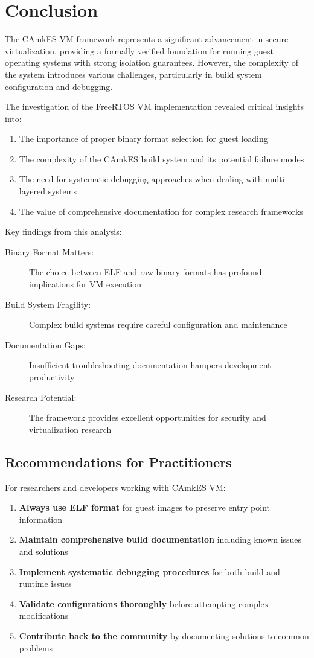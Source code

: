 \documentclass[11pt,a4paper]{article}
\begin{document}
\section{Conclusion}

The CAmkES VM framework represents a significant advancement in secure virtualization, providing a formally verified foundation for running guest operating systems with strong isolation guarantees. However, the complexity of the system introduces various challenges, particularly in build system configuration and debugging.

The investigation of the FreeRTOS VM implementation revealed critical insights into:

\begin{enumerate}
\item The importance of proper binary format selection for guest loading
\item The complexity of the CAmkES build system and its potential failure modes
\item The need for systematic debugging approaches when dealing with multi-layered systems
\item The value of comprehensive documentation for complex research frameworks
\end{enumerate}

Key findings from this analysis:

\begin{description}
\item[Binary Format Matters:] The choice between ELF and raw binary formats has profound implications for VM execution
\item[Build System Fragility:] Complex build systems require careful configuration and maintenance
\item[Documentation Gaps:] Insufficient troubleshooting documentation hampers development productivity
\item[Research Potential:] The framework provides excellent opportunities for security and virtualization research
\end{description}

\subsection{Recommendations for Practitioners}

For researchers and developers working with CAmkES VM:

\begin{enumerate}
\item \textbf{Always use ELF format} for guest images to preserve entry point information
\item \textbf{Maintain comprehensive build documentation} including known issues and solutions
\item \textbf{Implement systematic debugging procedures} for both build and runtime issues
\item \textbf{Validate configurations thoroughly} before attempting complex modifications
\item \textbf{Contribute back to the community} by documenting solutions to common problems
\end{enumerate}
\end{document}
